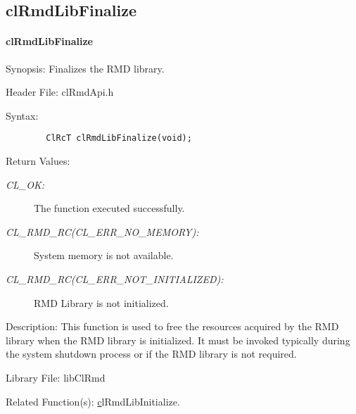 \begin{flushleft}
\newpage
\subsection{clRmdLibFinalize}
\hypertarget{pagermd105}{}\paragraph{cl\-Rmd\-Lib\-Finalize}\label{pagermd105}
\begin{Desc}
\item[Synopsis:]Finalizes the RMD library.\end{Desc}
\begin{Desc}
\item[Header File:]clRmdApi.h\end{Desc}
\begin{Desc}
\item[Syntax:]

\footnotesize\begin{verbatim}        ClRcT clRmdLibFinalize(void);
\end{verbatim}
\normalsize
\end{Desc}
\begin{Desc}
\item[Return Values:]
\begin{description}
\item[{\em CL\_\-OK:}]The function executed successfully. 
\item[{\em CL\_\-RMD\_\-RC(CL\_\-ERR\_\-NO\_\-MEMORY):}]System memory is not available.
\item[{\em CL\_\-RMD\_\-RC(CL\_\-ERR\_\-NOT\_\-INITIALIZED):}]RMD Library is not initialized. 
\end{description}
\end{Desc}
\begin{Desc}
\item[Description:]
This function is used to free the resources acquired by the RMD library when the RMD library is initialized. It must be invoked typically during the 
system shutdown process or if the RMD library is not required.
\end{Desc}
\begin{Desc}
\item[Library File:]lib\-Cl\-Rmd\end{Desc}
\begin{Desc}
\item[Related Function(s):]\hyperlink{pagermd104}clRmdLibInitialize. \end{Desc}
\end{flushleft}
